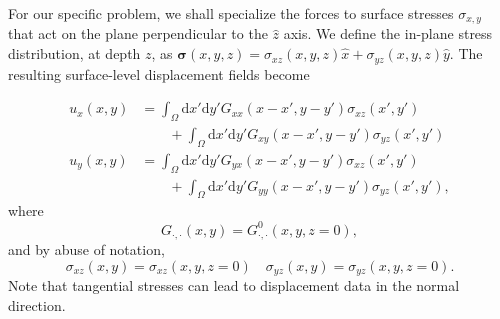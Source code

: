 \documentclass[aps,prl,reprint,twocolumn,groupedaddress,showpacs]{revtex4-1}
\def\dd{\mbox{d}}
\def\r{{\bf r}}
\def\u{{\bf u}}
\def\F{{\bf F}}
\def\F{{\bf F}}
\newcommand{\bs}{\boldsymbol{\sigma}}
\begin{document}
%
%
%
% 

% 

For our specific problem, we shall specialize the forces to surface
stresses $\sigma_{x,y}$ that act on the plane perpendicular to the
$\hat{z}$ axis. We define the in-plane stress distribution, at depth $z$, as
$\bs(x,y,z) = \sigma_{xz}(x,y,z)\hat{x} + \sigma_{yz}(x,y,z)\hat{y}$. 
The resulting surface-level displacement fields become

\begin{align}
u_{x}(x,y) &= \int_\Omega \dd x'\dd y'G_{xx}( x-x',y-y')\sigma_{xz}(x',y') \nonumber\\
&\qquad +  \int_\Omega \dd x'\dd y'G_{xy}( x-x',y-y')\sigma_{yz}(x',y') \label{eq:UMODEL1x}  \\
u_y(x,y) &= \int_\Omega \dd x'\dd y'G_{yx}( x-x',y-y')\sigma_{xz}(x',y') \nonumber\\
&\qquad +  \int_\Omega \dd x'\dd y'G_{yy}( x-x',y-y')\sigma_{yz}(x',y'),  \label{eq:UMODEL1y}  
\end{align}
where
\begin{equation}
G_{\cdot,\cdot}(x,y) = G^0_{\cdot,\cdot}(x,y,z=0),
\end{equation}
and by abuse of notation,
\begin{equation}
\sigma_{xz}(x,y) = \sigma_{xz}(x,y,z=0) \quad \sigma_{yz}(x,y) = \sigma_{yz}(x,y,z=0) .
\end{equation}
Note that tangential stresses can lead to displacement data in the normal direction.
\end{document}
